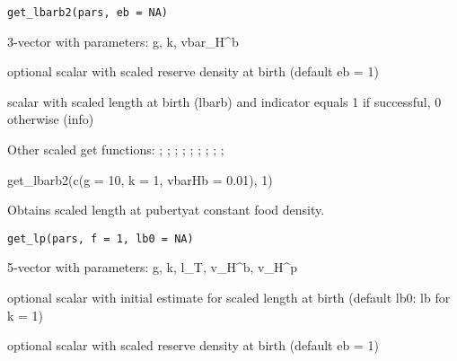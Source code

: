\documentclass[a4paper]{book}
\begin{document}
%
\begin{Usage}
\begin{verbatim}
get_lbarb2(pars, eb = NA)
\end{verbatim}
\end{Usage}
%
\begin{Arguments}
\begin{ldescription}
\item[\code{pars}] 3-vector with parameters: g, k, vbar\_H\textasciicircum{}b

\item[\code{eb}] optional scalar with scaled reserve density at birth (default eb = 1)
\end{ldescription}
\end{Arguments}
%
\begin{Value}
scalar with scaled length at birth (lbarb) and indicator equals 1 if successful, 0 otherwise (info)
\end{Value}
%
\begin{SeeAlso}\relax
Other scaled get functions: ;
; ;
; ;
; ;
;
;
\end{SeeAlso}
%
\begin{Examples}
\begin{ExampleCode}
get_lbarb2(c(g = 10, k = 1, vbarHb = 0.01), 1)
\end{ExampleCode}
\end{Examples}
%
\begin{Description}\relax
Obtains scaled length at pubertyat constant food density.
\end{Description}
%
\begin{Usage}
\begin{verbatim}
get_lp(pars, f = 1, lb0 = NA)
\end{verbatim}
\end{Usage}
%
\begin{Arguments}
\begin{ldescription}
\item[\code{pars}] 5-vector with parameters: g, k, l\_T, v\_H\textasciicircum{}b, v\_H\textasciicircum{}p

\item[\code{lb0}] optional scalar with initial estimate for scaled length at birth (default lb0: lb for k = 1)

\item[\code{eb}] optional scalar with scaled reserve density at birth (default eb = 1)
\end{ldescription}
\end{Arguments}
\end{document}
